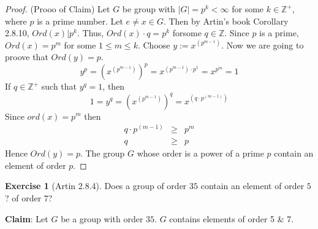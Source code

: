 \documentclass[
]{book}
\theoremstyle{definition}
\theoremstyle{definition}
\theoremstyle{definition}
\newtheorem{exercise}{Exercise}[chapter]
\theoremstyle{definition}
\theoremstyle{remark}
\begin{document}
\begin{proof}
(Prooo of Claim)
Let \(G\) be group with \(|G|=p^k<\infty\) for some \(k\in \mathbb{Z}^+\), where \(p\) is a prime number.
Let \(e\neq x \in G\). Then by Artin's book Corollary 2.8.10,
\(Ord(x)|p^k\). Thus, \(Ord(x)\cdot q=p^k\) forsome \(q\in \mathbb{Z}\).
Since \(p\) is a prime, \(Ord(x)=p^m\) for some \(1\leq m\leq k\).
Choose \(y:=x^{(p^{m-1})}\). Now we are going to proove that \(Ord(y)=p\).
\[y^p=\left(x^{(p^{m-1})}\right)^p=x^{(p^{m-1})\cdot p^1}=x^{p^m}=1\]
If \(q\in \mathbb{Z}^+\) such that \(y^q=1\), then
\[1=y^q=\left(x^{(p^{m-1})}\right)^q=x^{(q \cdot p^{(m-1)})}\]
Since \(ord(x)=p^m\) then
\begin{eqnarray*}
    q\cdot p^{(m-1)}&\geq & p^m  \\
    q &\geq & p
\end{eqnarray*}
Hence \(Ord(y)=p\). The group \(G\) whose order is a power of a prime \(p\) contain an element of order \(p\).
\end{proof}

\begin{exercise}[Artin 2.8.4]
\protect\hypertarget{exr:unnamed-chunk-189}{}\label{exr:unnamed-chunk-189}Does a group of order \(35\) contain an element of order \(5\)? of order \(7\)?
\end{exercise}

\textbf{Claim}: Let \(G\) be a group with order \(35\). \(G\) contains elements of order 5 \& 7.
\end{document}
